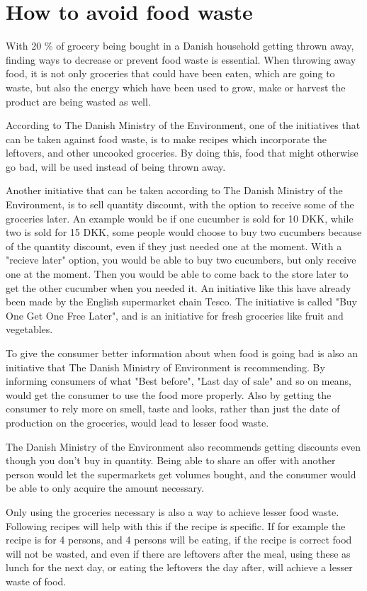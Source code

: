 \section{How to avoid food waste}
With 20 \% of grocery being bought in a Danish household getting thrown away, finding ways to decrease or prevent food waste is essential. When throwing away food, it is not only groceries that could have been eaten, which are going to waste, but also the energy which have been used to grow, make or harvest the product are being wasted as well.

According to The Danish Ministry of the Environment\cite{madSpild_Notat}, one of the initiatives that can be taken against food waste, is to make recipes which incorporate the leftovers, and other uncooked groceries. By doing this, food that might otherwise go bad, will be used instead of being thrown away.

Another initiative that can be taken according to The Danish Ministry of the Environment, is to sell quantity discount, with the option to receive some of the groceries later. An example would be if one cucumber is sold for 10 DKK, while two is sold for 15 DKK, some people would choose to buy two cucumbers because of the quantity discount, even if they just needed one at the moment. With a "recieve later" option, you would be able to buy two cucumbers, but only receive one at the moment. Then you would be able to come back to the store later to get the other cucumber when you needed it. An initiative like this have already been made by the English supermarket chain Tesco. The initiative is called "Buy One Get One Free Later", and is an initiative for fresh groceries like fruit and vegetables.

To give the consumer better information about when food is going bad is also an initiative that The Danish Ministry of Environment is recommending. By informing consumers of what "Best before", "Last day of sale" and so on means, would get the consumer to use the food more properly. Also by getting the consumer to rely more on smell, taste and looks, rather than just the date of production on the groceries, would lead to lesser food waste.

The Danish Ministry of the Environment also recommends getting discounts even though you don't buy in quantity. Being able to share an offer with another person would let the supermarkets get volumes bought, and the consumer would be able to only acquire the amount necessary.

Only using the groceries necessary is also a way to achieve lesser food waste. Following recipes will help with this if the recipe is specific. If for example the recipe is for 4 persons, and 4 persons will be eating, if the recipe is correct food will not be wasted, and even if there are leftovers after the meal, using these as lunch for the next day, or eating the leftovers the day after, will achieve a lesser waste of food\cite{madSpild_MindreMadspild}.

